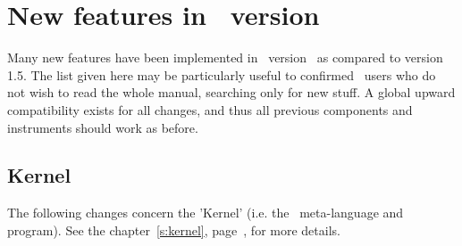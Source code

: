 
\chapter{New features in \MCS\ version \version\ }
\label{c:changes}

Many new features have been implemented in \MCS\ version \version\ as compared to version 1.5. The list given here may be particularly useful to confirmed \MCS\ users who do not wish to read the whole manual, searching only for new stuff. A global upward compatibility exists for all changes, and thus all previous components and instruments should work as before. 

\section{Kernel} 
\label{s:new-features:kernel}

The following changes concern the 'Kernel' (i.e. the \MCS\ meta-language and program). See the chapter~\ref{s:kernel}, page~\pageref{s:kernel}, for more details.

